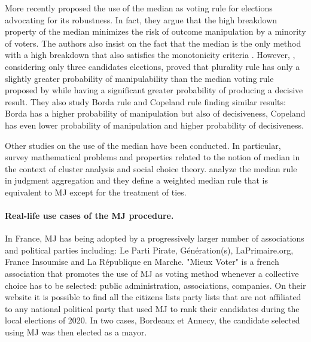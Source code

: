 More recently \citet{Bassett1999} proposed the use of the median as voting rule for elections advocating for its robustness. In fact, they argue that the high breakdown property of the median minimizes the risk of outcome manipulation by a minority of voters. The authors also insist on the fact that the median is the only method with a high breakdown that also satisfies the monotonicity criteria \citep{Bassett1994}. 
However, \citet{Gehrlein2003}, considering only three candidates elections, proved that plurality rule has only a slightly greater probability of manipulability than the median voting rule proposed by \citet{Bassett1999} while having a significant greater probability of producing a decisive result. They also study Borda rule and Copeland rule finding similar results: Borda has a higher probability of manipulation but also of decisiveness, Copeland has even lower probability of manipulation and higher probability of decisiveness.

Other studies on the use of the median have been conducted. In particular, \citet{Barthelemy1981} survey mathematical problems and properties related to the notion of median in the context of cluster analysis and social choice theory.
\cite{Nehring2022} analyze the median rule in judgment aggregation and they define a weighted median rule that is equivalent to \acs{MJ} except for the treatment of ties.

\paragraph{Real-life use cases of the \ac{MJ} procedure.}
In France, \ac{MJ} has being adopted by a progressively larger number of associations and political parties including: Le Parti Pirate, Génération(s), LaPrimaire.org, France Insoumise and La République en Marche.
"Mieux Voter" \citep{MV} is a french association that promotes the use of \ac{MJ} as voting method whenever a collective choice has to be selected: public administration, associations, companies. On their website it is possible to find all the citizens lists \textendash party lists that are not affiliated to any national political party \textemdash that used \ac{MJ} to rank their candidates during the local elections of 2020. In two cases, Bordeaux et Annecy, the candidate selected using \ac{MJ} was then elected as a mayor. 

